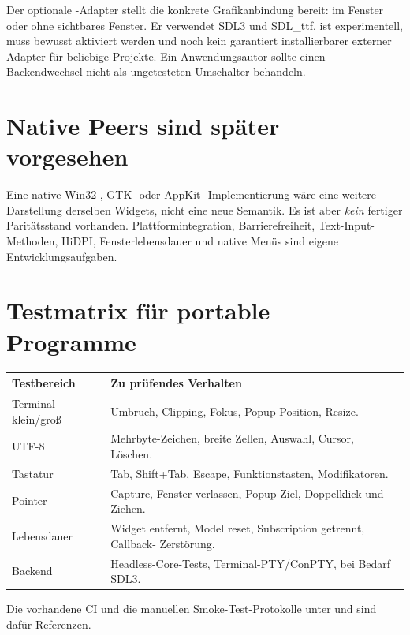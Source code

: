 Der optionale -Adapter stellt die
konkrete Grafikanbindung bereit: im Fenster
oder ohne sichtbares Fenster. Er verwendet
SDL3 und SDL\_ttf, ist experimentell,
muss bewusst aktiviert werden und
noch kein garantiert installierbarer
externer Adapter für beliebige Projekte.
Ein Anwendungsautor sollte einen
Backendwechsel nicht als
ungetesteten Umschalter behandeln.

\section{Native Peers sind später vorgesehen}
Eine native Win32-, GTK- oder AppKit-
Implementierung wäre eine weitere
Darstellung derselben Widgets,
nicht eine neue Semantik. Es ist aber
\emph{kein} fertiger Paritätsstand
vorhanden. Plattformintegration,
Barrierefreiheit, Text-Input-
Methoden, HiDPI, Fensterlebensdauer
und native Menüs sind eigene
Entwicklungsaufgaben.

\section{Testmatrix für portable Programme}

\noindent\begin{tabularx}{\linewidth}{@{}p{35mm}X@{}}
\toprule
Testbereich & Zu prüfendes Verhalten\\\midrule
Terminal klein/groß & Umbruch, Clipping,
Fokus, Popup-Position, Resize.\\
UTF-8 & Mehrbyte-Zeichen, breite
Zellen, Auswahl, Cursor, Löschen.\\
Tastatur & Tab, Shift+Tab, Escape,
Funktionstasten, Modifikatoren.\\
Pointer & Capture, Fenster verlassen,
Popup-Ziel, Doppelklick und Ziehen.\\
Lebensdauer & Widget entfernt, Model
reset, Subscription getrennt, Callback-
Zerstörung.\\
Backend & Headless-Core-Tests,
Terminal-PTY/ConPTY, bei Bedarf SDL3.\\
\bottomrule
\end{tabularx}
Die vorhandene CI und die manuellen
Smoke-Test-Protokolle unter
 und 
sind dafür Referenzen.

